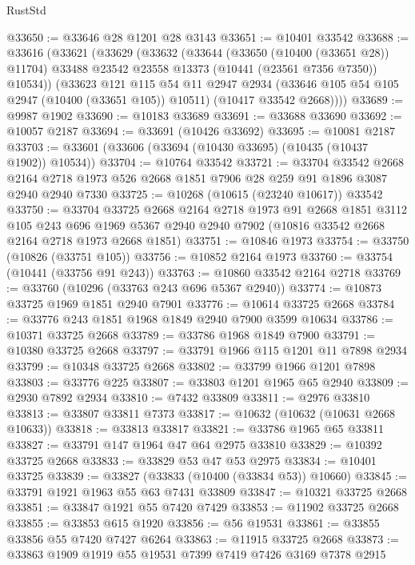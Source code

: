 \begin{lexlean}{RustStd}
\begin{coremodule}
@33650 := @33646 @28 @1201 @28 @3143
@33651 := @10401 @33542
@33688 := @33616
    (@33621
      (@33629
        (@33632
          (@33644
            (@33650 (@10400 (@33651 @28)) @11704)
            @33488
            @23542
            @23558
            @13373
            (@10441 (@23561 @7356 @7350))
            @10534))
        (@33623
          @121
          @115
          @54
          @11
          @2947
          @2934
          (@33646 @105 @54 @105 @2947 (@10400 (@33651 @105)) @10511)
          (@10417 @33542 @2668))))
@33689 := @9987 @1902
@33690 := @10183 @33689
@33691 := @33688 @33690
@33692 := @10057 @2187
@33694 := @33691 (@10426 @33692)
@33695 := @10081 @2187
@33703 := @33601 (@33606 (@33694 (@10430 @33695) (@10435 (@10437 @1902)) @10534))
@33704 := @10764 @33542
@33721 := @33704
    @33542
    @2668
    @2164
    @2718
    @1973
    @526
    @2668
    @1851
    @7906
    @28
    @259
    @91
    @1896
    @3087
    @2940
    @2940
    @7330
@33725 := @10268 (@10615 (@23240 @10617)) @33542
@33750 := @33704
    @33725
    @2668
    @2164
    @2718
    @1973
    @91
    @2668
    @1851
    @3112
    @105
    @243
    @696
    @1969
    @5367
    @2940
    @2940
    @7902
    (@10816 @33542 @2668 @2164 @2718 @1973 @2668 @1851)
@33751 := @10846 @1973
@33754 := @33750 (@10826 (@33751 @105))
@33756 := @10852 @2164 @1973
@33760 := @33754 (@10441 (@33756 @91 @243))
@33763 := @10860 @33542 @2164 @2718
@33769 := @33760 (@10296 (@33763 @243 @696 @5367 @2940))
@33774 := @10873 @33725 @1969 @1851 @2940 @7901
@33776 := @10614 @33725 @2668
@33784 := @33776 @243 @1851 @1968 @1849 @2940 @7900 @3599 @10634
@33786 := @10371 @33725 @2668
@33789 := @33786 @1968 @1849 @7900
@33791 := @10380 @33725 @2668
@33797 := @33791 @1966 @115 @1201 @11 @7898 @2934
@33799 := @10348 @33725 @2668
@33802 := @33799 @1966 @1201 @7898
@33803 := @33776 @225
@33807 := @33803 @1201 @1965 @65 @2940
@33809 := @2930 @7892 @2934
@33810 := @7432 @33809
@33811 := @2976 @33810
@33813 := @33807 @33811 @7373
@33817 := @10632 (@10632 (@10631 @2668 @10633))
@33818 := @33813 @33817
@33821 := @33786 @1965 @65 @33811
@33827 := @33791 @147 @1964 @47 @64 @2975 @33810
@33829 := @10392 @33725 @2668
@33833 := @33829 @53 @47 @53 @2975
@33834 := @10401 @33725
@33839 := @33827 (@33833 (@10400 (@33834 @53)) @10660)
@33845 := @33791 @1921 @1963 @55 @63 @7431 @33809
@33847 := @10321 @33725 @2668
@33851 := @33847 @1921 @55 @7420 @7429
@33853 := @11902 @33725 @2668
@33855 := @33853 @615 @1920
@33856 := @56 @19531
@33861 := @33855 @33856 @55 @7420 @7427 @6264
@33863 := @11915 @33725 @2668
@33873 := @33863 @1909 @1919 @55 @19531 @7399 @7419 @7426 @3169 @7378 @2915

\end{coremodule}
\end{lexlean}
